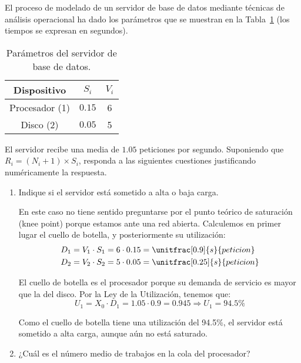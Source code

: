 \begin{ejercicio}\label{ej:5.24}
    El proceso de modelado de un servidor de base de datos mediante técnicas de análisis operacional ha dado los parámetros que se muestran en la Tabla~\ref{tab:5.24} (los tiempos se expresan en segundos).
    \begin{table}[h]
        \centering
        \begin{tabular}{|c|c|c|}
            \hline
            Dispositivo & $S_i$ & $V_i$ \\
            \hline
            Procesador (1) & $0.15$ & 6 \\
            Disco (2) & $0.05$ & 5 \\
            \hline
        \end{tabular}
        \caption{Parámetros del servidor de base de datos.}
        \label{tab:5.24}
    \end{table}
    El servidor recibe una media de $1.05$ peticiones por segundo. Suponiendo que $R_i = (N_i + 1) \times S_i$, responda a las siguientes cuestiones justificando numéricamente la respuesta.
    \begin{enumerate}
        \item Indique si el servidor está sometido a alta o baja carga.
        
        En este caso no tiene sentido preguntarse por el punto teórico de saturación (knee point) porque estamos ante una red abierta. Calculemos en primer lugar el cuello de botella, y posteriormente su utilización:
        \begin{align*}
            D_1 &= V_1 \cdot S_1 = 6 \cdot 0.15 = \unitfrac[0.9]{s}{peticion} \\
            D_2 &= V_2 \cdot S_2 = 5 \cdot 0.05 = \unitfrac[0.25]{s}{peticion}
        \end{align*}

        El cuello de botella es el procesador porque su demanda de servicio es mayor que la del disco. Por la Ley de la Utilización, tenemos que:
        \begin{equation*}
            U_1 = X_0 \cdot D_1 = 1.05 \cdot 0.9 = 0.945
            \Longrightarrow U_1 = 94.5\%
        \end{equation*}

        Como el cuello de botella tiene una utilización del 94.5\%, el servidor está sometido a alta carga, aunque aún no está saturado.
        \item ¿Cuál es el número medio de trabajos en la cola del procesador?
        

\end{enumerate}
\end{ejercicio}
